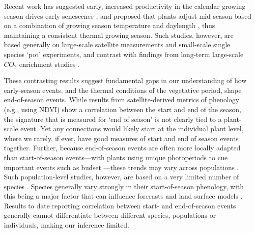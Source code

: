 \documentclass{article}[12pt]
\begin{document}
Recent work has suggested early, increased productivity in the calendar growing season drives early senescence \citep{Zani2020}, and proposed that plants adjust mid-season based on a combination of growing season temperature and daylength \citep{Zohner2023}, thus maintaining a consistent thermal growing season. Such studies, however, are based generally on large-scale satellite measurements and small-scale single species `pot' experiments, and contrast with findings from long-term large-scale $CO_2$ enrichment studies \citep{norby2021comment}.

These contrasting results suggest fundamental gaps in our understanding of how early-season events, and the thermal conditions of the vegetative period, shape end-of-season events. While results from satellite-derived metrics of phenology (e.g., using NDVI) show a correlation between the start and end of the season, the signature that is measured for `end of season' is not clearly tied to a plant-scale event. Yet any connections would likely start at the individual plant level, where we rarely, if ever, have good measures of start and end of season events together. Further, because end-of-season events are often more locally adapted than start-of-season events---with plants using unique photoperiods to cue important events such as budset \citep{bauerle2012photoperiodic,soolanayakanahally2013timing}---these trends may vary across populations \citep{aitken2016}. 
Such population-level studies, however, are based on a very limited number of species \citep{Zeng2024}. 
Species generally vary strongly in their start-of-season phenology, with this being a major factor that can influence forecasts \citep{Morales-Castilla2024} and land surface models \citep{ma2022}. Results to date reporting correlation between start- and end-of-season events generally cannot differentiate between different species, populations or individuals, making our inference limited. 
\end{document}
